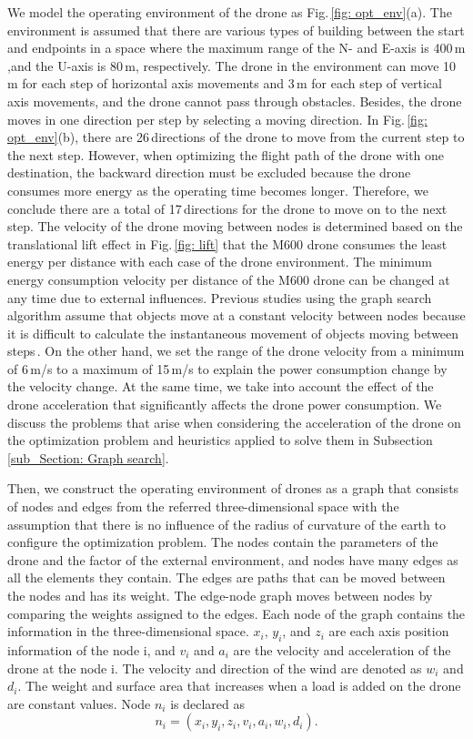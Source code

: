 \documentclass[journal]{./template/IEEEtran}
\begin{document}
We model the operating environment of the drone as Fig.\,\ref{fig: opt_env}(a).
The environment is assumed that there are various types of building between the start and endpoints in a space where the maximum range of the N- and E-axis is 400\,m ,and the U-axis is 80\,m, respectively.
The drone in the environment can move 10\,m for each step of horizontal axis movements and 3\,m for each step of vertical axis movements, and the drone cannot pass through obstacles. 
Besides, the drone moves in one direction per step by selecting a moving direction.
In Fig.\,\ref{fig: opt_env}(b), there are 26\,directions of the drone to move from the current step to the next step.
However, when optimizing the flight path of the drone with one destination, the backward direction must be excluded because the drone consumes more energy as the operating time becomes longer. Therefore, we conclude there are a total of 17\,directions for the drone to move on to the next step.
The velocity of the drone moving between nodes is determined based on the translational lift effect in Fig.\,\ref{fig: lift} that the M600 drone consumes the least energy per distance with each case of the drone environment. 
The minimum energy consumption velocity per distance of the M600 drone can be changed at any time due to external influences.  
Previous studies using the graph search algorithm assume that objects move at a constant velocity between nodes because it is difficult to calculate the instantaneous movement of objects moving between steps\,\cite{ref_8, ref_10, ref_22}. 
On the other hand, we set the range of the drone velocity from a minimum of 6\,m/s to a maximum of 15\,m/s to explain the power consumption change by the velocity change. 
At the same time, we take into account the effect of the drone acceleration that significantly affects the drone power consumption.
We discuss the problems that arise when considering the acceleration of the drone on the optimization problem and heuristics applied to solve them in Subsection\,\ref{sub_Section: Graph search}.

Then, we construct the operating environment of drones as a graph that consists of nodes and edges from the referred three-dimensional space with the assumption that there is no influence of the radius of curvature of the earth to configure the optimization problem. 
The nodes contain the parameters of the drone and the factor of the external environment, and nodes have many edges as all the elements they contain.
The edges are paths that can be moved between the nodes and has its weight.
The edge-node graph moves between nodes by comparing the weights assigned to the edges.  
Each node of the graph contains the information in the three-dimensional space. $x_i$, $y_i$, and $z_i$ are each axis position information of the node i, and $v_i$ and $a_i$ are the velocity and acceleration of the drone at the node i. 
The velocity and direction of the wind are denoted as $w_i$ and $d_i$. The weight and surface area that increases when a load is added on the drone are constant values.
Node $n_i$ is declared as 
\begin{equation*}
n_i = (x_i, y_i, z_i, v_i, a_i, w_i, d_i).
\end{equation*}
\end{document}
